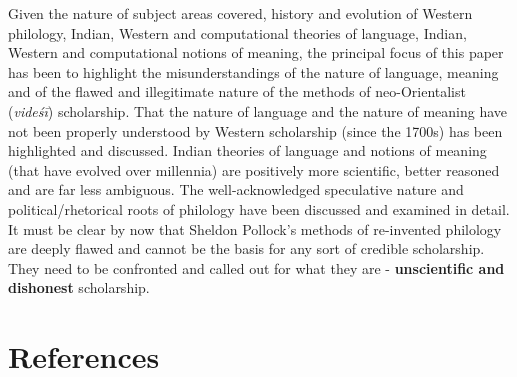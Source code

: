 Given the nature of subject areas covered, history and evolution of Western philology, Indian, Western and computational theories of language, Indian, Western and computational notions of meaning, the principal focus of this paper has been to highlight the misunderstandings of the nature of language, meaning and of the flawed and illegitimate nature of the methods of neo-Orientalist (\textit{videśī}) scholarship. That the nature of language and the nature of meaning have not been properly understood by Western scholarship (since the 1700s) has been highlighted and discussed. Indian theories of language and notions of meaning (that have evolved over millennia) are positively more scientific, better reasoned and are far less ambiguous. The well-acknow\-ledged speculative nature and political/rhetorical roots of philology have been discussed and examined in detail. It must be clear by now that Sheldon Pollock’s methods of re-invented philology are deeply flawed and cannot be the basis for any sort of credible scholarship. They need to be confronted and called out for what they are - \textbf{unscientific and dishonest} scholarship.


\section*{References}

